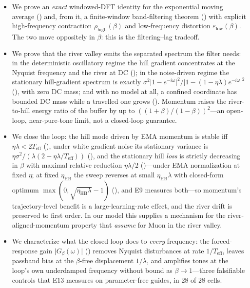 \documentclass[11pt,a4paper]{article}
\theoremstyle{remark}
\newcommand{\Teff}{T_{\mathrm{eff}}}
\newcommand{\rhohigh}{\rho_{\mathrm{high}}}
\newcommand{\epslow}{\varepsilon_{\mathrm{low}}}
\begin{document}
\begin{itemize}
\item We prove an \emph{exact} windowed-DFT identity for the exponential moving average () and, from it, a finite-window band-filtering theorem () with explicit high-frequency contraction $\rhohigh(\beta)$ and low-frequency distortion $\epslow(\beta)$.
The two move oppositely in $\beta$: this is the filtering--lag tradeoff.
\item We prove that the river valley emits the separated spectrum the filter needs: in the deterministic oscillatory regime the hill gradient concentrates at the Nyquist frequency and the river at DC (); in the noise-driven regime the stationary hill-gradient spectrum is exactly $\sigma^2\lvert1-e^{-i\omega}\rvert^2/\lvert1-(1-\eta\lambda)e^{-i\omega}\rvert^2$ (), with zero DC mass; and with no model at all, a confined coordinate has bounded DC mass while a travelled one grows ().
Momentum raises the river-to-hill energy ratio of the buffer by up to $((1+\beta)/(1-\beta))^2$---an open-loop, near-pure-tone limit, not a closed-loop guarantee.
\item We close the loop: the hill mode driven by EMA momentum is stable iff $\eta\lambda<2\Teff$ (), under white gradient noise its stationary variance is $\eta\sigma^2/(\lambda(2-\eta\lambda/\Teff))$ (), and the stationary hill \emph{loss} is strictly decreasing in $\beta$ with maximal relative reduction $\eta\lambda/2$ ()---under EMA normalization at fixed $\eta$; at fixed $\eta_{\mathrm{HB}}$ the sweep reverses at small $\eta_{\mathrm{HB}}\lambda$ with closed-form optimum $\max(0,\sqrt{\eta_{\mathrm{HB}}\lambda}-1)$ (), and E9 measures both---so momentum's trajectory-level benefit is a large-learning-rate effect, and the river drift is preserved to first order.
In our model this supplies a mechanism for the river-aligned-momentum property that \citet{shen2026muon} \emph{assume} for Muon in the river valley.
\item We characterize what the closed loop does to \emph{every} frequency: the forced-response gain $\lvert G_\beta(\omega)\rvert$ () removes Nyquist disturbances at rate $1/\Teff$, leaves passband bias at the $\beta$-free displacement $1/\lambda$, and amplifies tones at the loop's own underdamped frequency without bound as $\beta\to1$---three falsifiable controls that E13 measures on parameter-free guides, in $28$ of $28$ cells.

\end{itemize}
\end{document}
